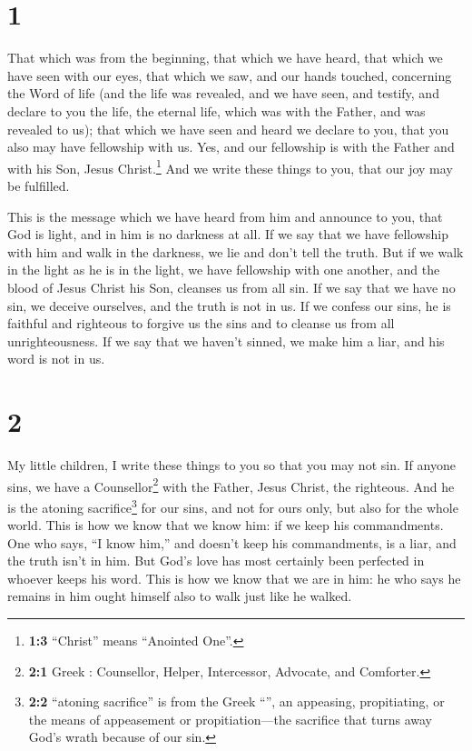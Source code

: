 \hypertarget{section}{%
\section{1}\label{section}}

 That which was from the beginning, that which we have
heard, that which we have seen with our eyes, that which we saw, and our
hands touched, concerning the Word of life  (and the life
was revealed, and we have seen, and testify, and declare to you the
life, the eternal life, which was with the Father, and was revealed to
us);  that which we have seen and heard we declare to you,
that you also may have fellowship with us. Yes, and our fellowship is
with the Father and with his Son, Jesus Christ.\footnote{\textbf{1:3}
  ``Christ'' means ``Anointed One''.}  And we write these
things to you, that our joy may be fulfilled.

 This is the message which we have heard from him and
announce to you, that God is light, and in him is no darkness at all.
 If we say that we have fellowship with him and walk in
the darkness, we lie and don't tell the truth.  But if we
walk in the light as he is in the light, we have fellowship with one
another, and the blood of Jesus Christ his Son, cleanses us from all
sin.  If we say that we have no sin, we deceive ourselves,
and the truth is not in us.  If we confess our sins, he is
faithful and righteous to forgive us the sins and to cleanse us from all
unrighteousness.  If we say that we haven't sinned, we
make him a liar, and his word is not in us.

\hypertarget{section-1}{%
\section{2}\label{section-1}}

 My little children, I write these things to you so that
you may not sin. If anyone sins, we have a Counsellor\footnote{\textbf{2:1}
  Greek : Counsellor, Helper, Intercessor, Advocate,
  and Comforter.} with the Father, Jesus Christ, the righteous.
 And he is the atoning sacrifice\footnote{\textbf{2:2}
  ``atoning sacrifice'' is from the Greek ``'', an
  appeasing, propitiating, or the means of appeasement or
  propitiation---the sacrifice that turns away God's wrath because of
  our sin.} for our sins, and not for ours only, but also for the whole
world.  This is how we know that we know him: if we keep
his commandments.  One who says, ``I know him,'' and
doesn't keep his commandments, is a liar, and the truth isn't in him.
 But God's love has most certainly been perfected in
whoever keeps his word. This is how we know that we are in him:
 he who says he remains in him ought himself also to walk
just like he walked.


